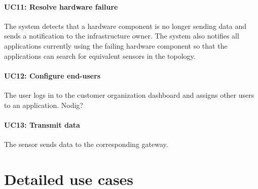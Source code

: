 \documentclass[english]{sareport}
\begin{document}
\paragraph{UC11: Resolve hardware failure}
The system detects that a hardware component is no longer sending data and sends a notification to the infrastructure owner. The system also notifies all applications currently using the failing hardware component so that the applications can search for equivalent sensors in the topology. 

\paragraph{UC12: Configure end-users}
The user logs in to the customer organization dashboard and assigns other users to an application.
Nodig?

\paragraph{UC13: Transmit data}
The sensor sends data to the corresponding gateway. 


\section{Detailed use cases}
\end{document}
